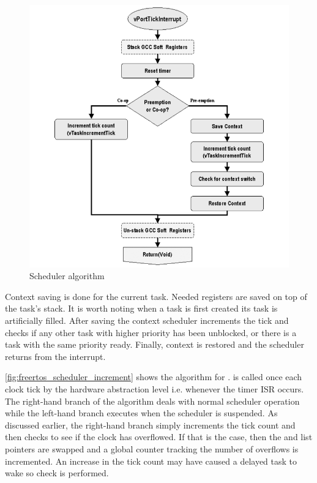 \begin{figure}[H]

      \centering
      \includegraphics[width=0.8\linewidth]{images/freertos_scheduler_overview.png}
      \caption{Scheduler algorithm\citep[p~20]{freertos_inner_workings}}
      \label{fig:freertos_scheduler_overview}
    
\end{figure}

Context saving is done for the current task. Needed registers are saved on top of the task's stack. It is worth noting when a task is first created its task is artificially filled. After saving the context scheduler increments the tick and checks if any other task with higher priority has been unblocked, or there is a task with the same priority ready. Finally, context is restored and the scheduler returns from the interrupt.  

\autoref{fig:freertos_scheduler_increment} shows the algorithm for .  is called once each clock tick by the hardware abstraction level i.e. whenever the timer ISR occurs. The right-hand
branch of the algorithm deals with normal scheduler operation while the left-hand branch
executes when the scheduler is suspended. As discussed earlier, the right-hand branch
simply increments the tick count and then checks to see if the clock has overflowed. If
that is the case, then the  and  list pointers are
swapped and a global counter tracking the number of overflows is incremented. An
increase in the tick count may have caused a delayed task to wake so check is performed.

